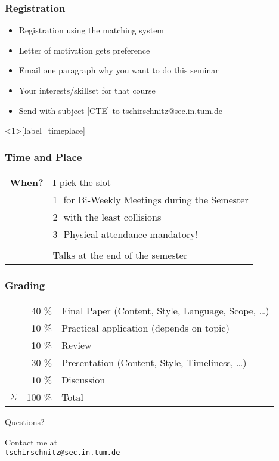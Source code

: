 \documentclass[xcolor={usenames,dvipsnames}]{beamer}
\begin{document}
\begin{frame}
	\frametitle{Registration}
	\begin{itemize}
		\item Registration using the \alert{matching system}
	  	\item Letter of motivation gets preference
	  	\item Email \alert{one paragraph} why you want to do this seminar
	  	\item Your interests/skillset for that course
	  	\item Send \alert{with subject} [CTE] to tschirschnitz@sec.in.tum.de 
	\end{itemize}
\end{frame}

\begin{frame}<1>[label=timeplace]
	\frametitle{Time and Place}
	\begin{center}
		\begin{tabular}{ll}
		        \textbf{When?}  & I pick the slot\\
		        						&\textcircled{1} for Bi-Weekly Meetings during the Semester\\
		        						&\textcircled{2} with the least collisions\\
		        						&\textcircled{3} Physical attendance mandatory!\\
					&\\
					& Talks at the \alert{end} of the semester \\
		\end{tabular}
	\end{center}
\end{frame}


\begin{frame}
\frametitle{Grading}
  \begin{tabular}{lrl}
             & \alert{40 \%}   & Final Paper (Content, Style, Language, Scope, \ldots)\\
	     		 & \alert{10 \%}   & Practical application (depends on topic)  \\
             & \alert{10 \%}   & Review      \\
             & \alert{30 \%}   & Presentation (Content, Style, Timeliness, \ldots) \\
             & \alert{10 \%}   & Discussion                                                   \\
    \midrule
	$\Sigma$ & \alert{100 \%}  & Total                                                        \\
  \end{tabular}
\end{frame}

\begin{frame}
	\begin{center}
		{\huge Questions?}

		\vspace{2cm}

		\begin{center}
			Contact me at \\ \texttt{tschirschnitz@sec.in.tum.de}
		\end{center}

		\vspace{1cm}
	\end{center}
\end{frame}
\end{document}
